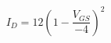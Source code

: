 \documentclass[preview]{standalone}
\begin{document}
\begin{align*}
I_D = 12 ( 1-\dfrac{V_{GS}}{-4} )^2
\end{align*}
\end{document}
